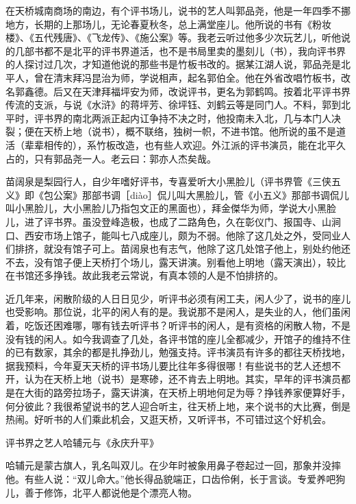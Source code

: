 \documentclass[12pt,UTF8]{ctexbook}
\begin{document}
在天桥城南商场的南边，有个评书场儿，说书的艺人叫郭品尧，他是一年四季不挪地方，长期的上那场儿，无论春夏秋冬，总上满堂座儿。他所说的书有《粉妆楼》、《五代残唐》、《飞龙传》、《施公案》等。我老云听过他多少次玩艺儿，听他说的几部书都不是北平的评书界道活，也不是书局里卖的墨刻儿（书），我向评书界的人探讨过几次，才知道他说的那些书是竹板书改的。据某江湖人说，郭品尧是北平人，曾在清末拜冯昆治为师，学说相声，起名郭伯全。他在外省改唱竹板书，改名郭鑫德。后又在天津拜福坪安为师，改说评书，更名为郭鹤鸣。按着北平评书界传流的支派，与说《水浒》的蒋坪芳、徐坪钰、刘鹤云等是同门人。不料，郭到北平时，评书界的南北两派正起内讧争持不决之时，他投南未入北，几与本门人决裂；便在天桥上地（说书），概不联络，独树一帜，不进书馆。他所说的虽不是道活（辈辈相传的），系竹板改造，也有些人欢迎。外江派的评书演员，能在北平久占的，只有郭品尧一人。老云曰：郭亦人杰矣哉。

苗阔泉是梨园行人，自少年嗜好评书，专喜爱听大小黑脸儿（评书界管《三侠五义》即《包公案》那部书调［diào］侃儿叫大黑脸儿，管《小五义》那部书调侃儿叫小黑脸儿，大小黑脸儿乃指包文正的黑面也），拜金傑华为师，学说大小黑脸儿，进了评书界。虽没登峰造极，也成了二路角色，久在彰仪门、报国寺、山涧口、西安市场上馆子，能叫七八成座儿，颇为不弱。他除了这几处之外，受同业人们排挤，就没有馆子可上。苗阔泉也有志气，他除了这几处馆子他上，别处约他还不去，没有馆子便上天桥打个场儿，露天讲演。别看他上明地（露天演出），较比在书馆还多挣钱。故此我老云常说，有真本领的人是不怕排挤的。

近几年来，闲散阶级的人日日见少，听评书必须有闲工夫，闲人少了，说书的座儿也受影响。那位说，北平的闲人有的是。我说那不是闲人，是失业的人，他们虽闲着，吃饭还困难哪，哪有钱去听评书？听评书的闲人，是有资格的闲散人物，不是没有钱的闲人。如今我调查了几处，各评书馆的座儿全都减少，开馆子的维持不住的已有数家，其余的都是扎挣劲儿，勉强支持。评书演员有许多的都往天桥找地，据我预料，今年夏天天桥的评书场儿要比往年多得很哪！有些说书的艺人还想不开，认为在天桥上地（说书）是寒碜，还不肯去上明地。其实，早年的评书演员都是在大街的路旁拉场子，露天讲演，在天桥上明地何足为辱？挣钱养家便算好手，何分彼此？我很希望说书的艺人迎合听主，往天桥上地，来个说书的大比赛，倒是热闹。好听书的人们乘此机会，又逛天桥，又听评书，不可错过这个好机会。





评书界之艺人哈辅元与《永庆升平》


哈辅元是蒙古旗人，乳名叫双儿。在少年时被象用鼻子卷起过一回，那象并没摔他。有些人说：“双儿命大。”他长得品貌端正，口齿伶俐，长于言谈。专爱养吧狗儿，善于修饰，北平人都说他是个漂亮人物。
\end{document}
